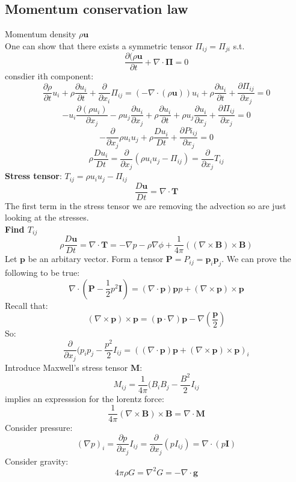 \documentclass{article}
\begin{document}
\subsection{Momentum conservation law}
Momentum density $\rho \bm u$\\
One can show that there exists a symmetric tensor $\Pi_{ij}=\Pi_{ji}$ s.t.
$$
\frac{\partial (\rho \bm u}{\partial t} + \nabla \cdot \bm{\Pi} = 0
$$
consdier ith component:
$$
\frac{\partial \rho}{\partial t} u_i + \rho \frac{\partial u_i}{\partial t} + \frac{\partial}{\partial x_i} \Pi_{ij} = (- \nabla \cdot(\rho \bm u))u_i + \rho \frac{\partial u_i}{\partial t} + \frac{\partial \Pi_{ij}}{\partial x_j}=0
$$
$$
-u_i \frac{\partial (\rho u_i)}{\partial x_j} - \rho u_j \frac{\partial u_i}{\partial x_j} + \rho \frac{\partial u_i}{\partial t} + \rho u_j \frac{\partial u_i}{\partial x_j}  + \frac{\partial \Pi_{ij}}{\partial x_j}=0
$$
$$
-\frac{\partial}{\partial x_j}{\rho u_i u_j} + \rho \frac{D u_i}{Dt}  + \frac{\partial Pi_{ij}}{\partial x_j}=0
$$
$$
\rho \frac{Du_i}{Dt} = \frac{\partial }{\partial x_j}(\rho u_i u_j - \Pi_{ij}) = \frac{\partial}{\partial x_j}T_{ij}
$$
\textbf{Stress tensor}: $T_{ij} = \rho u_i u_j - \Pi_{ij}$\\
\begin{equation}
\frac{D\bm u}{Dt} = \nabla \cdot \bm T
\end{equation}
The first term in the stress tensor we are removing the advection so are just looking at the stresses.\\
\textbf{Find $T_{ij}$}
$$
\rho \frac{D \bm u}{D t} = \nabla \cdot \bm T = - \nabla p - \rho \nabla \phi + \frac{1}{4\pi}((\nabla \times \bm B) \times \bm B)
$$
Let $\bm p$ be an arbitary vector. Form a tensor $\bm P = P_{ij} = \bm p_i \bm p_j$. We can prove the following to be true:
$$
\nabla \cdot(\bm P - \frac{1}{2} p^2\bm I) = (\nabla \cdot \bm p) \bm pp + (\nabla \times \bm p) \times \bm p
$$
Recall that:
$$
(\nabla \times \bm p) \times \bm p = (\bm p \cdot \nabla) \bm p - \nabla (\frac{\bm p}{2})
$$
So:
$$
\frac{\partial }{\partial x_j} (p_i p_j - \frac{p^2}{2} I_{ij} = ((\nabla \cdot \bm p)\bm p + (\nabla \times \bm p) \times \bm p)_i
$$
Introduce Maxwell's stress tensor $\bm M$:
$$
M_{ij} = \frac{1}{4 \pi} (B_i B_j - \frac{B^2}{2} I_{ij}
$$
implies an expresssion for the lorentz force:
$$
\frac{1}{4\pi} (\nabla \times \bm B) \times \bm B = \nabla \cdot \bm M
$$
Consider pressure:
$$
(\nabla p)_i = \frac{\partial p}{\partial x_j} I_{ij} = \frac{\partial}{\partial x_j}(pI_{ij}) = \nabla \cdot( p \bm I)
$$
Consider gravity:
$$
4 \pi \rho G = \nabla^2 G = - \nabla \cdot \bm g
$$
\end{document}
